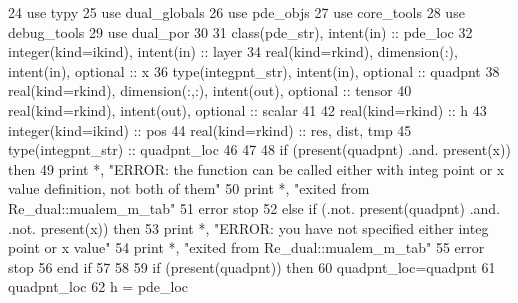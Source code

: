 \begin{DoxyCode}
24       \textcolor{keywordtype}{use }typy
25       \textcolor{keywordtype}{use }dual_globals
26       \textcolor{keywordtype}{use }pde_objs
27       \textcolor{keywordtype}{use }core_tools
28       \textcolor{keywordtype}{use }debug_tools
29       \textcolor{keywordtype}{use }dual_por
30 
31       \textcolor{keywordtype}{class}(pde_str), \textcolor{keywordtype}{intent(in)} :: pde\_loc
32       \textcolor{keywordtype}{integer(kind=ikind)}, \textcolor{keywordtype}{intent(in)} :: layer
34       \textcolor{keywordtype}{real(kind=rkind)}, \textcolor{keywordtype}{dimension(:)}, \textcolor{keywordtype}{intent(in)}, \textcolor{keywordtype}{optional} :: x
36       \textcolor{keywordtype}{type}(integpnt_str), \textcolor{keywordtype}{intent(in)}, \textcolor{keywordtype}{optional} :: quadpnt      
38       \textcolor{keywordtype}{real(kind=rkind)}, \textcolor{keywordtype}{dimension(:,:)}, \textcolor{keywordtype}{intent(out)}, \textcolor{keywordtype}{optional} :: tensor \textcolor{comment}{        }
40       \textcolor{keywordtype}{real(kind=rkind)}, \textcolor{keywordtype}{intent(out)}, \textcolor{keywordtype}{optional} :: scalar
41 
42       \textcolor{keywordtype}{real(kind=rkind)} :: h
43       \textcolor{keywordtype}{integer(kind=ikind)} :: pos
44       \textcolor{keywordtype}{real(kind=rkind)} :: res, dist, tmp
45       \textcolor{keywordtype}{type}(integpnt_str) :: quadpnt\_loc 
46       
47       
48       \textcolor{keywordflow}{if} (\textcolor{keyword}{present}(quadpnt) .and. \textcolor{keyword}{present}(x)) \textcolor{keywordflow}{then}
49                 print *, \textcolor{stringliteral}{"ERROR: the function can be called either with integ point or x value definition,
       not both of them"}
50                 print *, \textcolor{stringliteral}{"exited from Re\_dual::mualem\_m\_tab"}
51                 error stop
52       \textcolor{keywordflow}{else} \textcolor{keywordflow}{if} (.not. \textcolor{keyword}{present}(quadpnt) .and. .not. \textcolor{keyword}{present}(x)) \textcolor{keywordflow}{then}
53                 print *, \textcolor{stringliteral}{"ERROR: you have not specified either integ point or x value"}
54         print *, \textcolor{stringliteral}{"exited from Re\_dual::mualem\_m\_tab"}
55                 error stop
56 \textcolor{keywordflow}{      end if}
57       
58      
59       \textcolor{keywordflow}{if} (\textcolor{keyword}{present}(quadpnt)) \textcolor{keywordflow}{then}
60         quadpnt\_loc=quadpnt
61             quadpnt\_loc%
62             h = pde\_loc%

\end{DoxyCode}
